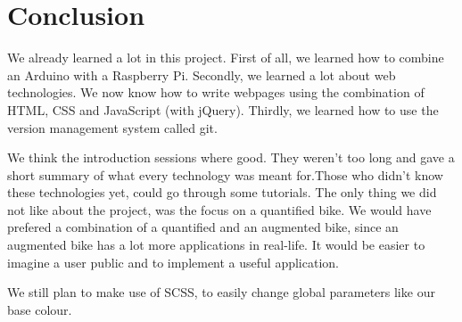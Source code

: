 \section{Conclusion}
We already learned a lot in this project. First of all, we learned how to combine an
Arduino with a Raspberry Pi. Secondly, we learned a lot about web technologies. We now
know how to write webpages using the combination of HTML, CSS and JavaScript (with
jQuery). Thirdly, we learned how to use the version management system called git.

We think the introduction sessions where good. They weren't too long and gave a short summary of what every technology was meant for.Those who didn't know these
technologies yet, could go through some tutorials. The only thing we did not like about the project, was the focus on 
a quantified bike. We would have prefered a combination of a quantified and an augmented bike, since an augmented bike
has a lot more applications in real-life. It would be easier to imagine a user public and to implement a useful application.

We still plan to make use of SCSS, to easily change global parameters like our base colour.
